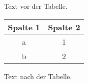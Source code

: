 Text vor der Tabelle.

\begin{tabular}{|c|c|}
	\hline
	Spalte 1 & Spalte 2 \\
	\hline
	a & 1 \\
	\hline
	b & 2 \\
	\hline
\end{tabular}

Text nach der Tabelle.